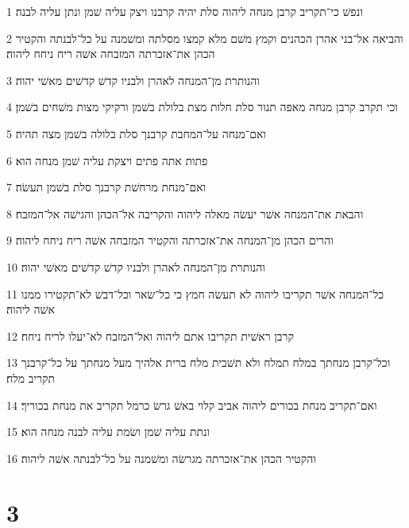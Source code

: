 \par 1 ונפשׁ כי־תקריב קרבן מנחה ליהוה סלת יהיה קרבנו ויצק עליה שׁמן ונתן עליה לבנה׃
\par 2 והביאה אל־בני אהרן הכהנים וקמץ משׁם מלא קמצו מסלתה ומשׁמנה על כל־לבנתה והקטיר הכהן את־אזכרתה המזבחה אשׁה ריח ניחח ליהוה׃
\par 3 והנותרת מן־המנחה לאהרן ולבניו קדשׁ קדשׁים מאשׁי יהוה׃
\par 4 וכי תקרב קרבן מנחה מאפה תנור סלת חלות מצת בלולת בשׁמן ורקיקי מצות משׁחים בשׁמן׃
\par 5 ואם־מנחה על־המחבת קרבנך סלת בלולה בשׁמן מצה תהיה׃
\par 6 פתות אתה פתים ויצקת עליה שׁמן מנחה הוא׃
\par 7 ואם־מנחת מרחשׁת קרבנך סלת בשׁמן תעשׂה׃
\par 8 והבאת את־המנחה אשׁר יעשׂה מאלה ליהוה והקריבה אל־הכהן והגישׁה אל־המזבח׃
\par 9 והרים הכהן מן־המנחה את־אזכרתה והקטיר המזבחה אשׁה ריח ניחח ליהוה׃
\par 10 והנותרת מן־המנחה לאהרן ולבניו קדשׁ קדשׁים מאשׁי יהוה׃
\par 11 כל־המנחה אשׁר תקריבו ליהוה לא תעשׂה חמץ כי כל־שׂאר וכל־דבשׁ לא־תקטירו ממנו אשׁה ליהוה׃
\par 12 קרבן ראשׁית תקריבו אתם ליהוה ואל־המזבח לא־יעלו לריח ניחח׃
\par 13 וכל־קרבן מנחתך במלח תמלח ולא תשׁבית מלח ברית אלהיך מעל מנחתך על כל־קרבנך תקריב מלח׃
\par 14 ואם־תקריב מנחת בכורים ליהוה אביב קלוי באשׁ גרשׂ כרמל תקריב את מנחת בכוריך׃
\par 15 ונתת עליה שׁמן ושׂמת עליה לבנה מנחה הוא׃
\par 16 והקטיר הכהן את־אזכרתה מגרשׂה ומשׁמנה על כל־לבנתה אשׁה ליהוה׃

\chapter{3}

